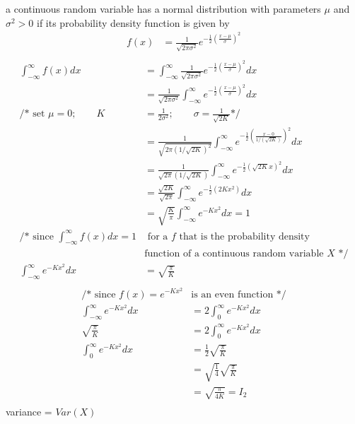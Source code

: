 \documentclass[12pt,border=4pt,multi]{article}%
\begin{document}
a continuous random variable has a normal distribution with parameters $\mu$ and $\sigma^2 > 0$ if its probability density function is given by
{\large
\begin{align*}
f(x) &= \frac{1}{\sqrt{2\pi\sigma^2}} e^{-\frac{1}{2}\left(\frac{x - \mu}{\sigma}\right)^2}\\
\end{align*}}
\begin{align*}
\int_{-\infty}^{\infty} f(x) dx &= \int_{-\infty}^{\infty} \frac{1}{\sqrt{2\pi\sigma^2}} e^{-\frac{1}{2}\left(\frac{x - \mu}{\sigma}\right)^2} dx\\
&= \frac{1}{\sqrt{2\pi\sigma^2}} \int_{-\infty}^{\infty} e^{-\frac{1}{2}\left(\frac{x - \mu}{\sigma}\right)^2} dx\\
\text{/* set } \mu = 0; \qquad K &= \frac{1}{2\sigma^2}; \qquad \sigma = \frac{1}{\sqrt{2K}} \text{*/}\\
&= \frac{1}{\sqrt{2\pi(1/\sqrt{2K})^2}} \int_{-\infty}^{\infty} e^{-\frac{1}{2}\left(\frac{x - 0}{1/(\sqrt{2K})}\right)^2} dx\\
&= \frac{1}{\sqrt{2\pi}(1/\sqrt{2K})} \int_{-\infty}^{\infty} e^{-\frac{1}{2}\left(\sqrt{2K}x\right)^2} dx\\
&= \frac{\sqrt{2K}}{\sqrt{2\pi}} \int_{-\infty}^{\infty} e^{-\frac{1}{2}\left(2Kx^2\right)} dx\\
&= \sqrt{\frac{K}{\pi}} \int_{-\infty}^{\infty} e^{-Kx^2} dx = 1\\
\text{/* since } \int_{-\infty}^{\infty} f(x)dx  = 1 &\text{ for a $f$ that is the probability density}\\
&\text{function of a continuous random variable $X$}\text{ */}\\
\int_{-\infty}^{\infty} e^{-Kx^2} dx &= \sqrt{\frac{\pi}{K}}\\
\end{align*}
\begin{align*}
\text{/* since } f(x) = e^{-Kx^2} &\text{is an even function */}\\
\int_{-\infty}^{\infty} e^{-Kx^2} dx &= 2\int_0^{\infty} e^{-Kx^2} dx\\
\sqrt{\frac{\pi}{K}} &=  2\int_0^{\infty} e^{-Kx^2} dx\\
\int_0^{\infty} e^{-Kx^2} dx &= \frac{1}{2}\sqrt{\frac{\pi}{K}}\\
&= \sqrt{\frac{1}{4}}\sqrt{\frac{\pi}{K}}\\
&= \sqrt{\frac{\pi}{4K}} = I_2\\
\end{align*}
variance = $Var(X)$
\end{document}
